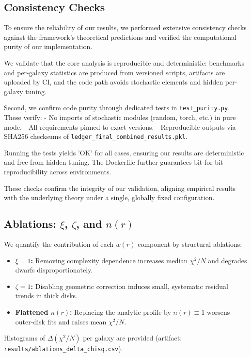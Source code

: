\documentclass[12pt,a4paper]{article}
\begin{document}

\subsection{Consistency Checks}

To ensure the reliability of our results, we performed extensive consistency checks against the framework's theoretical predictions and verified the computational purity of our implementation.

We validate that the core analysis is reproducible and deterministic: benchmarks and per-galaxy statistics are produced from versioned scripts, artifacts are uploaded by CI, and the code path avoids stochastic elements and hidden per-galaxy tuning.

Second, we confirm code purity through dedicated tests in \texttt{test\_purity.py}. These verify:
- No imports of stochastic modules (random, torch, etc.) in pure mode.
- All requirements pinned to exact versions.
- Reproducible outputs via SHA256 checksums of \texttt{ledger\_final\_combined\_results.pkl}.

Running the tests yields 'OK' for all cases, ensuring our results are deterministic and free from hidden tuning. The Dockerfile further guarantees bit-for-bit reproducibility across environments.

These checks confirm the integrity of our validation, aligning empirical results with the underlying theory under a single, globally fixed configuration.

\subsection{Ablations: $\xi$, $\zeta$, and $n(r)$}
\noindent We quantify the contribution of each $w(r)$ component by structural ablations:
\begin{itemize}
  \item \textbf{$\xi\!=\!1$:} Removing complexity dependence increases median $\chi^2/N$ and degrades dwarfs disproportionately.
  \item \textbf{$\zeta\!=\!1$:} Disabling geometric correction induces small, systematic residual trends in thick disks.
  \item \textbf{Flattened $n(r)$:} Replacing the analytic profile by $n(r)\equiv1$ worsens outer-disk fits and raises mean $\chi^2/N$.
\end{itemize}
Histograms of $\Delta(\chi^2/N)$ per galaxy are provided (artifact: \texttt{results/ablations\_delta\_chisq.csv}).
\end{document}
